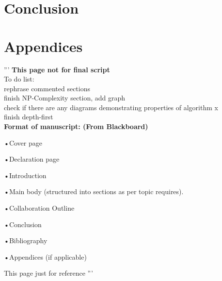 \documentclass{article}
\begin{document}
\section{Conclusion}
\clearpage



\clearpage
\section{Appendices}
\clearpage
'''
\textbf{This page not for final script}\\
To do list:\\
rephrase commented sections\\
finish NP-Complexity section, add graph\\
check if there are any diagrams demonstrating properties of algorithm x\\
finish depth-first\\


\textbf{Format of manuscript: (From Blackboard)}

•Cover page

•Declaration page

•Introduction

•Main body (structured into sections as per topic requires).

•Collaboration Outline

•Conclusion 

•Bibliography

•Appendices (if applicable)

This page just for reference
'''
\end{document}

